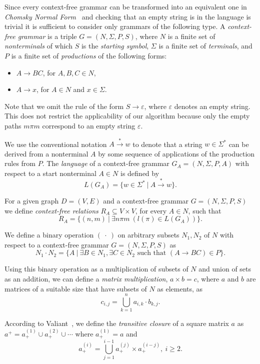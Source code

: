 \documentclass[runningheads,a4paper]{llncs}
\begin{document}
Since every context-free grammar can be transformed into an equivalent one in \textit{Chomsky Normal Form}~\cite{chomsky} and checking that an empty string is in the language is trivial it is sufficient to consider only grammars of the following type. A \textit{context-free grammar} is a triple $G = (N, \Sigma, P, S)$, where $N$ is a finite set of \textit{nonterminals} of which $S$ is the \textit{starting symbol}, $\Sigma$ is a finite set of \textit{terminals}, and $P$ is a finite set of \textit{productions} of the following forms:

\begin{itemize}
	\item $A \rightarrow B C$, for $A,B,C \in N$,
	\item $A \rightarrow x$, for $A \in N$ and $x \in \Sigma$.   
\end{itemize}

Note that we omit the rule of the form $S \rightarrow \varepsilon$, where $\varepsilon$ denotes an empty string. This does not restrict the applicability of our algorithm because only the empty paths $m \pi m$ correspond to an empty string $\varepsilon$.

We use the conventional notation $A \xrightarrow{*} w$ to denote that a string $w \in \Sigma^*$ can be derived from a nonterminal $A$ by some sequence of applications of the production rules from $P$. The \textit{language} of a context-free grammar $G_A = (N,\Sigma,P,A)$ with respect to a start nonterminal $A \in N$ is defined by $$L(G_A) = \{w \in \Sigma^*~|~A \xrightarrow{*} w\}.$$

For a given graph $D = (V, E)$ and a context-free grammar $G = (N, \Sigma, P, S)$ we define \textit{context-free relations} $R_A \subseteq V \times V$, for every $A \in N$, such that $$R_A = \{(n,m)~|~\exists n \pi m~(l(\pi) \in L(G_A))\}.$$

We define a binary operation $(~\cdot~)$ on arbitrary subsets $N_1 , N_2$ of $N$ with respect to a context-free grammar $G = (N, \Sigma, P,S)$ as $$N_1 \cdot N_2 = \{A~|~\exists B \in N_1, \exists C \in N_2 \text{ such that }(A \rightarrow B C) \in P\}.$$

Using this binary operation as a multiplication of subsets of $N$ and union of sets as an addition, we can define a \textit{matrix multiplication}, $a \times b = c$, where $a$ and $b$ are matrices of a suitable size that have subsets of $N$ as elements, as $$c_{i,j} = \bigcup^{n}_{k=1}{a_{i,k} \cdot b_{k,j}}.$$

According to Valiant~\cite{valiant}, we define the \textit{transitive closure} of a square matrix $a$ as $a^+ = a^{(1)}_+ \cup a^{(2)}_+ \cup \cdots$ where $a^{(1)}_+ = a$ and $$a^{(i)}_+ = \bigcup^{i-1}_{j=1}{a^{(j)}_+ \times a^{(i-j)}_+}, ~i \ge 2.$$
\end{document}
